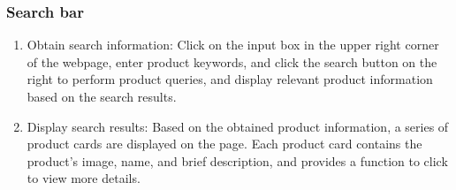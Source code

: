 \documentclass{article}
\begin{document}
\subsubsection{Search bar}
\begin{enumerate}
    \item Obtain search information: Click on the input box in the upper right corner of the webpage, enter product keywords, and click the search button on the right to perform product queries, and display relevant product information based on the search results.
    \item Display search results: Based on the obtained product information, a series of product cards are displayed on the page. Each product card contains the product's image, name, and brief description, and provides a function to click to view more details.
\end{enumerate}
\end{document}
